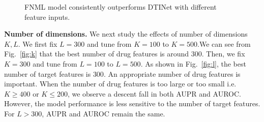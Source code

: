 \documentclass[conference]{IEEEtran}
\begin{document}
\begin{figure}[!ht]
\centering
{}

\vspace*{-10pt}
\caption{FNML model consistently outperforms DTINet with different feature inputs.}\label{fig:stability}
\end{figure}



\textbf{Number of dimensions.}  We next study the effects of number of dimensions $K,L$. We first fix $L=300$ and tune from $K=100$ to $K=500$.We can see from Fig.~\ref{fig:k} that the best number of drug features is around $300$. Then, we fix $K=300$ and tune from $L=100$ to $L=500$. As shown in Fig.~\ref{fig:l}, the best number of target features is $300$. An appropriate number of drug features is important. When the number of drug features is too large or too small i.e. $K\ge400$ or $K\le200$, we observe a descent fall in both AUPR and AUROC. However, the model performance is less sensitive to the number of target features. For $L>300$, AUPR and AUROC remain the same.   
\end{document}
